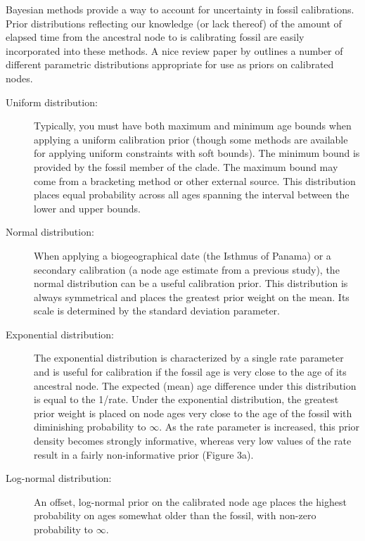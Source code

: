 Bayesian methods provide a way to account for uncertainty in fossil calibrations. Prior
distributions reflecting our knowledge (or lack thereof) of the amount of elapsed time from the ancestral
node to is calibrating fossil are easily incorporated into these methods.
A nice review paper by \cite{Ho2009} outlines a number of different parametric distributions
appropriate for use as priors on calibrated nodes.
\begin{description}
\item [Uniform distribution:] Typically, you must have both maximum and minimum age bounds when applying
a uniform calibration prior (though some methods are available for applying uniform constraints with soft bounds). The minimum bound is provided by the fossil member of the clade. The maximum bound may
come from a bracketing method or other external source. This distribution places equal probability across
all ages spanning the interval between the lower and upper bounds.
\item [Normal distribution:] When applying a biogeographical date (\EG the Isthmus of Panama) or a secondary calibration (a node age estimate from a previous study), the normal distribution can be a useful calibration prior. 
This distribution is always symmetrical and places the greatest prior weight on the mean. 
Its scale is determined by the standard deviation parameter.  
\item [Exponential distribution:] The exponential distribution is characterized by a single rate parameter and is useful for calibration if the fossil age is very close to the age of its ancestral node. 
The expected (mean) age difference under this distribution is equal to the 1/rate. 
Under the exponential distribution, the greatest prior weight is placed on node ages very close to the age of the fossil with diminishing probability to $\infty$. 
As the rate parameter is increased, this prior density becomes strongly informative, whereas very low values of the rate result in a fairly non-informative prior (Figure 3a).
\item [Log-normal distribution:] An offset, log-normal prior on the calibrated node age places the highest probability on ages somewhat older than the fossil, with non-zero probability to $\infty$. 
\end{description}

